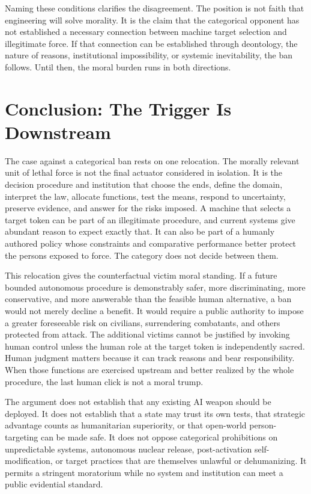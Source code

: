 \documentclass[11pt]{article}
\begin{document}
Naming these conditions clarifies the disagreement. The position is not faith that engineering will solve morality. It is the claim that the categorical opponent has not established a necessary connection between machine target selection and illegitimate force. If that connection can be established through deontology, the nature of reasons, institutional impossibility, or systemic inevitability, the ban follows. Until then, the moral burden runs in both directions.

\section{Conclusion: The Trigger Is Downstream}
\label{sec:conclusion}

The case against a categorical ban rests on one relocation. The morally relevant unit of lethal force is not the final actuator considered in isolation. It is the decision procedure and institution that choose the ends, define the domain, interpret the law, allocate functions, test the means, respond to uncertainty, preserve evidence, and answer for the risks imposed. A machine that selects a target token can be part of an illegitimate procedure, and current systems give abundant reason to expect exactly that. It can also be part of a humanly authored policy whose constraints and comparative performance better protect the persons exposed to force. The category does not decide between them.

This relocation gives the counterfactual victim moral standing. If a future bounded autonomous procedure is demonstrably safer, more discriminating, more conservative, and more answerable than the feasible human alternative, a ban would not merely decline a benefit. It would require a public authority to impose a greater foreseeable risk on civilians, surrendering combatants, and others protected from attack. The additional victims cannot be justified by invoking human control unless the human role at the target token is independently sacred. Human judgment matters because it can track reasons and bear responsibility. When those functions are exercised upstream and better realized by the whole procedure, the last human click is not a moral trump.

The argument does not establish that any existing AI weapon should be deployed. It does not establish that a state may trust its own tests, that strategic advantage counts as humanitarian superiority, or that open-world person-targeting can be made safe. It does not oppose categorical prohibitions on unpredictable systems, autonomous nuclear release, post-activation self-modification, or target practices that are themselves unlawful or dehumanizing. It permits a stringent moratorium while no system and institution can meet a public evidential standard.
\end{document}
